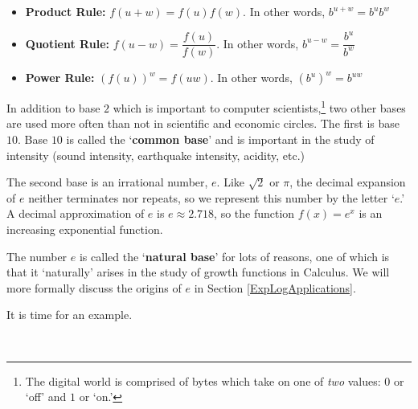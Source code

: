 \documentclass{ximera}
\begin{document}
{\begin{theorem}
\begin{itemize}

\item  \textbf{Product Rule:}  $f(u+w) = f(u) f(w)$.  In other words, $b^{u+w} = b^{u} b^{w}$

\item  \textbf{Quotient Rule:}  $f(u-w) = \dfrac{f(u)}{f(w)}$.  In other words, $b^{u-w} = \dfrac{b^{u}}{b^{w}}$

\item  \textbf{Power Rule:}  $\left(f(u)\right)^w = f(uw)$.  In other words, $\left(b^{u}\right)^{w} = b^{uw}$

\end{itemize}

\end{theorem}


\smallskip

In addition to base $2$ which is important to computer scientists,\footnote{The digital world is comprised of bytes which take on one of \textit{two} values: $0$ or `off' and $1$ or `on.'} two other bases are used more often than not in scientific and economic circles.  The first is base  $10$.  Base $10$ is called the `\textbf{common base}' and is important in the study of intensity (sound intensity, earthquake intensity, acidity, etc.)   

\smallskip


The second base is an irrational number, $e$.  Like $\sqrt{2}$ or $\pi$, the decimal expansion of $e$ neither terminates nor repeats, so we represent this number by the letter `$e$.'  A decimal approximation of $e$ is $e \approx 2.718$, so the function $f(x) = e^{x}$ is an increasing exponential function.   

\smallskip

The number $e$ is called the `\textbf{natural base}' for lots of reasons, one of which is that it `naturally' arises in the study of growth functions in Calculus.  We will more formally discuss the origins of $e$  in Section \ref{ExpLogApplications}.

\smallskip
 
It is time for an example.

\begin{example} \label{expfcngraphsex} $~$


\end{example}}
\end{document}

